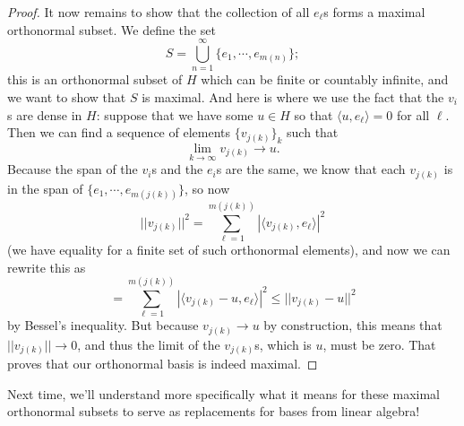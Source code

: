 \begin{proof}
It now remains to show that the collection of all $e_\ell$s forms a maximal orthonormal subset. We define the set 
\[
    S = \bigcup_{n=1}^{\infty} \{e_1, \cdots, e_{m(n)}\};
\]
this is an orthonormal subset of $H$ which can be finite or countably infinite, and we want to show that $S$ is maximal. And here is where we use the fact that the $v_i$s are dense in $H$: suppose that we have some $u \in H$ so that $\langle u, e_\ell \rangle = 0$ for all $\ell$. Then we can find a sequence of elements $\{v_{j(k)}\}_k$ such that 
\[
    \lim_{k \to \infty} v_{j(k)} \to u.
\]
Because the span of the $v_i$s and the $e_i$s are the same, we know that each $v_{j(k)}$ is in the span of $\{e_1, \cdots, e_{m(j(k))}\}$, so now 
\[
    \boxed{||v_{j(k)}||^2} = \sum_{\ell = 1}^{m(j(k))} |\langle v_{j(k)}, e_\ell \rangle|^2
\]
(we have equality for a finite set of such orthonormal elements), and now we can rewrite this as 
\[
    = \sum_{\ell = 1}^{m(j(k))} |\langle v_{j(k)} - u, e_\ell \rangle|^2 \le \boxed{||v_{j(k)} - u||^2}
\]
by Bessel's inequality. But because $v_{j(k)} \to u$ by construction, this means that $||v_{j(k)}|| \to 0$, and thus the limit of the $v_{j(k)}$s, which is $u$, must be zero. That proves that our orthonormal basis is indeed maximal.
\end{proof}

Next time, we'll understand more specifically what it means for these maximal orthonormal subsets to serve as replacements for bases from linear algebra!
